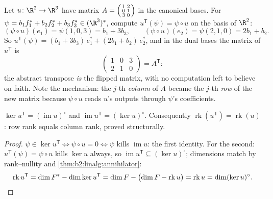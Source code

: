 \begin{example}\label{ex:b2:linalg:transposework}
Let $u \colon \R^2 \to \R^3$ have matrix $A =
\begin{psmallmatrix} 1 & 2\\ 0 & 1\\ 3 & 0\end{psmallmatrix}$ in
the canonical bases. For $\psi = b_1f_1^* + b_2f_2^* + b_3f_3^*
\in (\R^3)^*$, compute $u^{\mathsf T}(\psi) = \psi \circ u$ on
the basis of $\R^2$:
\[
(\psi \circ u)(e_1) = \psi(1, 0, 3) = b_1 + 3b_3,
\qquad
(\psi \circ u)(e_2) = \psi(2, 1, 0) = 2b_1 + b_2 .
\]
So $u^{\mathsf T}(\psi) = (b_1 + 3b_3)\,e_1^* + (2b_1 +
b_2)\,e_2^*$, and in the dual bases the matrix of $u^{\mathsf T}$
is
\[
\begin{pmatrix} 1 & 0 & 3\\ 2 & 1 & 0\end{pmatrix}
= A^{\mathsf T} :
\]
the abstract transpose \emph{is} the flipped matrix, with no
computation left to believe on faith. Note the mechanism: the
$j$-th \emph{column} of $A$ became the $j$-th \emph{row} of the
new matrix because $\psi \circ u$ reads $u$'s outputs through
$\psi$'s coefficients.
\end{example}

\begin{proposition}\label{prop:b2:linalg:transposerank}
$\ker u^{\mathsf T} = (\operatorname{im} u)^{\circ}$ and
$\operatorname{im} u^{\mathsf T} = (\ker u)^{\circ}$. Consequently
$\operatorname{rk}(u^{\mathsf T}) = \operatorname{rk}(u)$: row rank
equals column rank, proved structurally.
\end{proposition}

\begin{proof}
$\psi \in \ker u^{\mathsf T} \iff \psi \circ u = 0 \iff \psi$ kills
$\operatorname{im} u$: the first identity. For the second: $u^{\mathsf
T}(\psi) = \psi \circ u$ kills $\ker u$ always, so
$\operatorname{im} u^{\mathsf T} \subseteq (\ker u)^\circ$;
dimensions match by rank--nullity and
\cref{thm:b2:linalg:annihilator}:
\[
\operatorname{rk} u^{\mathsf T} = \dim F^* - \dim\ker u^{\mathsf T}
= \dim F - \bigl(\dim F - \operatorname{rk} u\bigr)
= \operatorname{rk} u
= \dim (\ker u)^{\circ} . \qedhere
\]
\end{proof}

